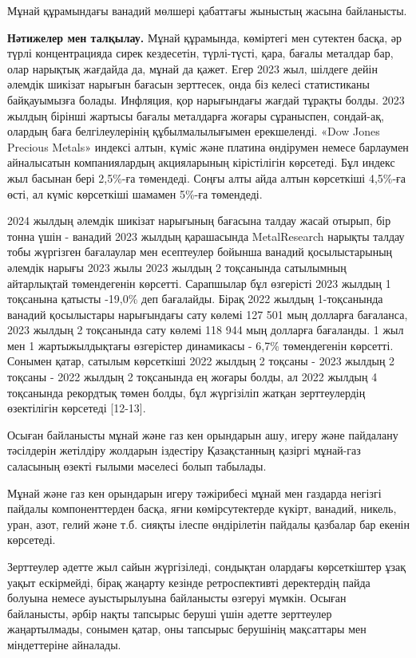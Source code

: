 \begin{multicols}{2}

Мұнай құрамындағы ванадий мөлшері қабаттағы жыныстың жасына байланысты.

{\bfseries Нәтижелер мен талқылау.} Мұнай құрамында, көміртегі мен сутектен
басқа, әр түрлі концентрацияда сирек кездесетін, түрлі-түсті, қара,
бағалы металдар бар, олар нарықтық жағдайда да, мұнай да қажет. Егер
2023 жыл, шілдеге дейін әлемдік шикізат нарығын бағасын зерттесек, онда
біз келесі статистиканы байқауымызға болады. Инфляция, қор нарығындағы
жағдай тұрақты болды. 2023 жылдың бірінші жартысы бағалы металдарға
жоғары сұраныспен, сондай-ақ, олардың баға белгілеулерінің
құбылмалылығымен ерекшеленді. «Dow Jones Precious Metals» индексі алтын,
күміс және платина өндірумен немесе барлаумен айналысатын компаниялардың
акцияларының кірістілігін көрсетеді. Бұл индекс жыл басынан бері
2,5\%-ға төмендеді. Соңғы алты айда алтын көрсеткіші 4,5\%-ға өсті, ал
күміс көрсеткіші шамамен 5\%-ға төмендеді.

2024 жылдың әлемдік шикізат нарығының бағасына талдау жасай отырып, бір
тонна үшін - ванадий 2023 жылдың қарашасында MetalResearch нарықты
талдау тобы жүргізген бағалаулар мен есептеулер бойынша ванадий
қосылыстарының әлемдік нарығы 2023 жылы 2023 жылдың 2 тоқсанында
сатылымның айтарлықтай төмендегенін көрсетті. Сарапшылар бұл өзгерісті
2023 жылдың 1 тоқсанына қатысты -19,0\% деп бағалайды. Бірақ 2022 жылдың
1-тоқсанында ванадий қосылыстары нарығындағы сату көлемі 127 501 мың
долларға бағаланса, 2023 жылдың 2 тоқсанында сату көлемі 118 944 мың
долларға бағаланды. 1 жыл мен 1 жартыжылдықтағы өзгерістер динамикасы -
6,7\% төмендегенін көрсетті. Сонымен қатар, сатылым көрсеткіші 2022
жылдың 2 тоқсаны - 2023 жылдың 2 тоқсаны - 2022 жылдың 2 тоқсанында ең
жоғары болды, ал 2022 жылдың 4 тоқсанында рекордтық төмен болды, бұл
жүргізіліп жатқан зерттеулердің өзектілігін көрсетеді {[}12-13{]}.

Осыған байланысты мұнай және газ кен орындарын ашу, игеру және пайдалану
тәсілдерін жетілдіру жолдарын іздестіру Қазақстанның қазіргі мұнай-газ
саласының өзекті ғылыми мәселесі болып табылады.

Мұнай және газ кен орындарын игеру тәжірибесі мұнай мен газдарда негізгі
пайдалы компоненттерден басқа, яғни көмірсутектерде күкірт, ванадий,
никель, уран, азот, гелий және т.б. сияқты ілеспе өндірілетін пайдалы
қазбалар бар екенін көрсетеді.

Зерттеулер әдетте жыл сайын жүргізіледі, сондықтан олардағы көрсеткіштер
ұзақ уақыт ескірмейді, бірақ жаңарту кезінде ретроспективті деректердің
пайда болуына немесе ауыстырылуына байланысты өзгеруі мүмкін. Осыған
байланысты, әрбір нақты тапсырыс беруші үшін әдетте зерттеулер
жаңартылмады, сонымен қатар, оны тапсырыс берушінің мақсаттары мен
міндеттеріне айналады.


\end{multicols}
